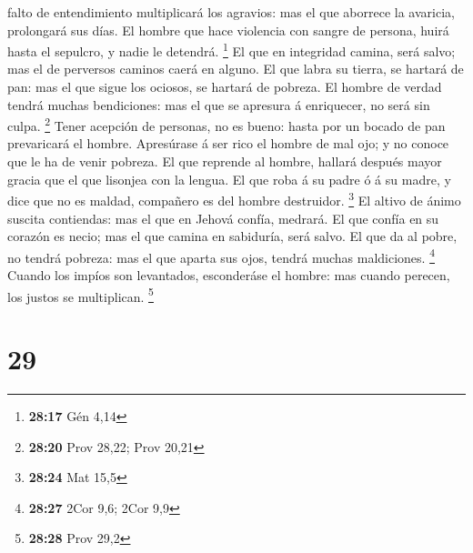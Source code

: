 falto de entendimiento multiplicará los agravios: mas el que aborrece la
avaricia, prolongará sus días.  El hombre que hace
violencia con sangre de persona, huirá hasta el sepulcro, y nadie le
detendrá. \footnote{\textbf{28:17} Gén 4,14}  El que en
integridad camina, será salvo; mas el de perversos caminos caerá en
alguno.  El que labra su tierra, se hartará de pan: mas el
que sigue los ociosos, se hartará de pobreza.  El hombre de
verdad tendrá muchas bendiciones: mas el que se apresura á enriquecer,
no será sin culpa. \footnote{\textbf{28:20} Prov 28,22; Prov 20,21}
 Tener acepción de personas, no es bueno: hasta por un
bocado de pan prevaricará el hombre.  Apresúrase á ser rico
el hombre de mal ojo; y no conoce que le ha de venir pobreza.
 El que reprende al hombre, hallará después mayor gracia
que el que lisonjea con la lengua.  El que roba á su padre
ó á su madre, y dice que no es maldad, compañero es del hombre
destruidor. \footnote{\textbf{28:24} Mat 15,5}  El altivo
de ánimo suscita contiendas: mas el que en Jehová confía, medrará.
 El que confía en su corazón es necio; mas el que camina en
sabiduría, será salvo.  El que da al pobre, no tendrá
pobreza: mas el que aparta sus ojos, tendrá muchas maldiciones.
\footnote{\textbf{28:27} 2Cor 9,6; 2Cor 9,9}  Cuando los
impíos son levantados, esconderáse el hombre: mas cuando perecen, los
justos se multiplican. \footnote{\textbf{28:28} Prov 29,2}

\hypertarget{section-28}{%
\section{29}\label{section-28}}

